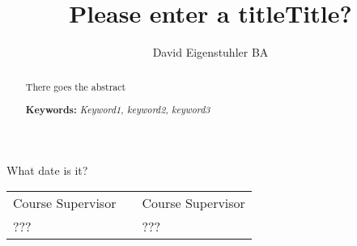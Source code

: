 \documentclass[12pt]{llncs} %
\begin{document}
 
%
\frontmatter          %
%
\pagestyle{headings}  %
%

\author{David Eigenstuhler BA}
\title{Please enter a title}
\maketitle

\begin{flushright}\noindent
What date is it?
\end{flushright}
\vspace{1cm}

\begin{tabular}{p{4cm}p{4cm}p{4cm}}
Course Supervisor & & Course Supervisor \tabularnewline 
??? & & ??? \tabularnewline 
\end{tabular} 



\vspace{1cm}
\begin{abstract}
There goes the abstract\\
\vspace{1cm}
 
\textbf{Keywords: }
\textit{Keyword1, keyword2, keyword3}
\end{abstract}

%
%
\mainmatter              %
%
\title{Title?}
%



\clearpage




\printindex



\clearpage

%
\end{document}
